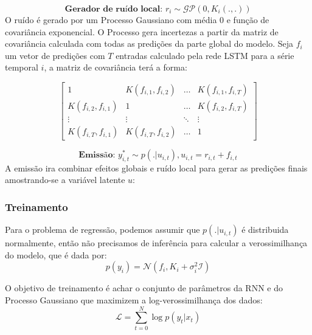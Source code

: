 \[
  \textbf{Gerador de ruído local: }  r_i \sim \mathcal{GP} (0, K_i(.,.))
\]
O ruído é gerado por um Processo Gaussiano com média 0 e função de covariância
exponencial. O Processo gera incertezas a partir da matriz de covariância
calculada com todas as predições da parte global do modelo. Seja $f_i$ um vetor
de predições com $T$ entradas calculado pela rede LSTM para a série temporal $i$, a matriz de covariância
terá a forma:  

\[
  \begin{bmatrix}
    1& K(f_{i,1},f_{i,2}) & \dots &K(f_{i,1},f_{i,T}) \\ 
    K(f_{i,2},f_{i,1}) &1  & \dots & K(f_{i,2},f_{i,T})\\ 
    \vdots &  \vdots  & \ddots & \vdots\\
    K(f_{i,T},f_{i,1})& K(f_{i,T},f_{i,2}) & \dots & 1 
  \end{bmatrix} 
\]

\[
  \textbf{Emissão: }  y^*_{i,t} \sim p(. | u_{i,t}) , u_{i,t} = r_{i,t} + f_{i,t}  
\]
A emissão ira combinar efeitos globais e ruído local para gerar as predições
finais amostrando-se a variável latente $u$:
  

\subsubsection{Treinamento}

Para o problema de regressão, podemos assumir que $p(. | u_{i,t})$ é distribuida
normalmente, então não precisamos de inferência para calcular a verossimilhança do modelo, que é dada por: \\

\[
p(y_{i}) = \mathcal{N}(f_i,K_i + \sigma_i^2\mathcal{I})
\]

O objetivo de treinamento é achar o conjunto de parâmetros da RNN e do Processo Gaussiano que maximizem a log-verossimilhança dos dados: \\
\[
\mathcal{L} = \sum_{t=0}^N{\log p(y_t|x_t)}
\]


